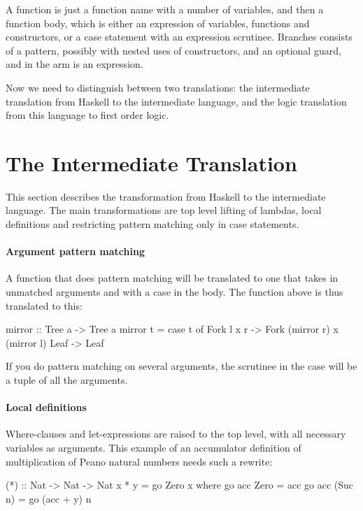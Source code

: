 A function is just a function name with a number of variables, and
then a function body, which is either an expression of variables,
functions and constructors, or a case statement with an expression
scrutinee. Branches consists of a pattern, possibly with nested uses
of constructors, and an optional guard, and in the arm is an
expression.

Now we need to distinguish between two translations: the intermediate
translation from Haskell to the intermediate language, and the logic
translation from this language to first order logic.

\section{The Intermediate Translation}

This section describes the transformation from Haskell to the
intermediate language. The main transformations are top level lifting
of lambdas, local definitions and restricting pattern matching only in
case statements.

\paragraph{Argument pattern matching} A function that does pattern matching will be translated to one that
takes in unmatched arguments and with a case in the body. The
 function above is thus translated to this:

\begin{code}
mirror :: Tree a -> Tree a
mirror t = case t of
   Fork l x r -> Fork (mirror r) x (mirror l)
   Leaf       -> Leaf
\end{code}

\noindent
If you do pattern matching on several arguments, the scrutinee in the
case will be a tuple of all the arguments.

\paragraph{Local definitions} Where-clauses and let-expressions are
raised to the top level, with all necessary variables as
arguments. This example of an accumulator definition of multiplication
of Peano natural numbers needs such a rewrite:

\begin{code}
(*) :: Nat -> Nat -> Nat
x * y = go Zero x
  where
    go acc Zero    = acc
    go acc (Suc n) = go (acc + y) n
\end{code}


